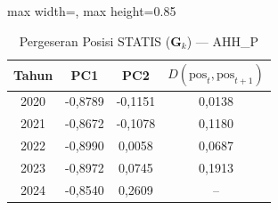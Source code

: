 \begin{table}[H]
\centering
\caption{Pergeseran Posisi STATIS ($\mathbf{G}_k$) --- AHH_P} \label{tab:app2jarak_statis_loading_ahh_p}
\begin{adjustbox}{max width=\textwidth, max height=0.85\textheight}
\begin{tabular}{|c|c|c|c|}
\hline
\textbf{Tahun} & \textbf{PC1} & \textbf{PC2} & \textbf{$D(\text{pos}_t, \text{pos}_{t+1})$} \\
\hline
2020 & -0,8789 & -0,1151 & 0,0138 \\
2021 & -0,8672 & -0,1078 & 0,1180 \\
2022 & -0,8990 & 0,0058 & 0,0687 \\
2023 & -0,8972 & 0,0745 & 0,1913 \\
2024 & -0,8540 & 0,2609 & -- \\
\hline
\end{tabular}
\end{adjustbox}
\end{table}